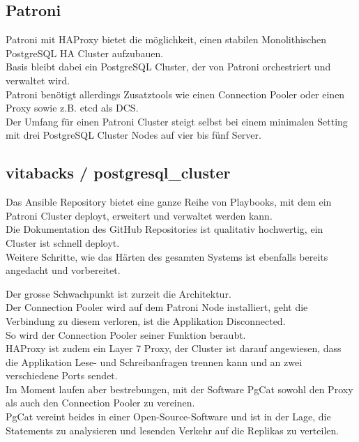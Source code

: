 \begin{flushleft}
    \subsection{Patroni}
    Patroni mit \Gls{HAProxy} bietet die möglichkeit, einen stabilen Monolithischen \Gls{PostgreSQL HA Cluster} aufzubauen.\\
    Basis bleibt dabei ein \Gls{PostgreSQL Cluster}, der von Patroni orchestriert und verwaltet wird.\\
    Patroni benötigt allerdings Zusatztools wie einen \Gls{Connection Pooler} oder einen Proxy sowie z.B. \gls{etcd} als DCS.\\
    Der Umfang für einen Patroni Cluster steigt selbst bei einem minimalen Setting mit drei \Gls{PostgreSQL Cluster} Nodes auf vier bis fünf Server.
    \subsection{vitabacks / postgresql\_cluster}
    Das \Gls{Ansible} Repository bietet eine ganze Reihe von Playbooks, mit dem ein Patroni Cluster deployt, erweitert und verwaltet werden kann.\\
    Die Dokumentation des \Gls{GitHub} Repositories ist qualitativ hochwertig, ein Cluster ist schnell deployt.\\
    Weitere Schritte, wie das Härten des gesamten Systems ist ebenfalls bereits angedacht und vorbereitet.
\end{flushleft}
\begin{flushleft}
    Der grosse Schwachpunkt ist zurzeit die Architektur.\\
    Der \Gls{Connection Pooler} wird auf dem Patroni Node installiert, geht die Verbindung zu diesem verloren, ist die Applikation Disconnected.\\
    So wird der \Gls{Connection Pooler} seiner Funktion beraubt.\\
    \Gls{HAProxy} ist zudem ein Layer 7 Proxy, der Cluster ist darauf angewiesen, dass die Applikation Lese- und Schreibanfragen trennen kann und an zwei verschiedene Ports sendet.\\
    Im Moment laufen aber bestrebungen, mit der Software PgCat sowohl den Proxy als auch den \Gls{Connection Pooler} zu vereinen.\\
    PgCat vereint beides in einer Open-Source-Software und ist in der Lage, die Statements zu analysieren und lesenden Verkehr auf die Replikas zu verteilen.\\
\end{flushleft}